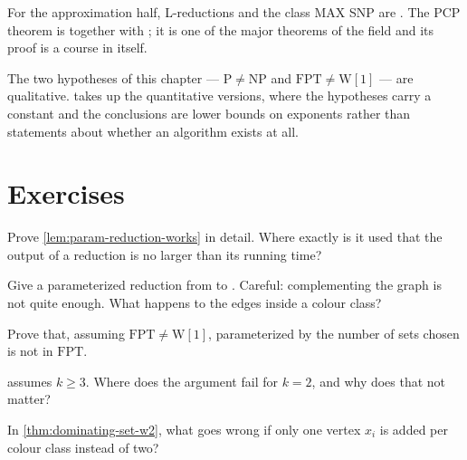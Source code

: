 For the approximation half, L-reductions and the class MAX SNP are
\citet{PapadimitriouYannakakis1991}. The PCP theorem is
\citet{AroraSafra1998} together with
\citet{AroraLundMotwaniSudanSzegedy1998}; it is one of the major theorems of
the field and its proof is a course in itself.

The two hypotheses of this chapter --- $\mathrm{P} \ne \mathrm{NP}$ and
$\mathrm{FPT} \ne \mathrm{W}[1]$ --- are qualitative. 
takes up the quantitative versions, where the hypotheses carry a constant and
the conclusions are lower bounds on exponents rather than statements about
whether an algorithm exists at all.

\section{Exercises}
\label{sec:ex-hardness}

\begin{exercise}
Prove \cref{lem:param-reduction-works} in detail. Where exactly is it used that
the output of a reduction is no larger than its running time?
\end{exercise}

\begin{exercise}\label{ex:multicoloured-is}
Give a parameterized reduction from  to
. Careful: complementing the graph is not
quite enough. What happens to the edges inside a colour class?
\end{exercise}

\begin{exercise}
Prove that, assuming $\mathrm{FPT} \ne \mathrm{W}[1]$, 
parameterized by the number of sets chosen is not in $\mathrm{FPT}$.
\end{exercise}

\begin{exercise}
 assumes $k \ge 3$. Where does the argument fail for
$k = 2$, and why does that not matter?
\end{exercise}

\begin{exercise}
In \cref{thm:dominating-set-w2}, what goes wrong if only one vertex $x_i$ is
added per colour class instead of two?
\end{exercise}

